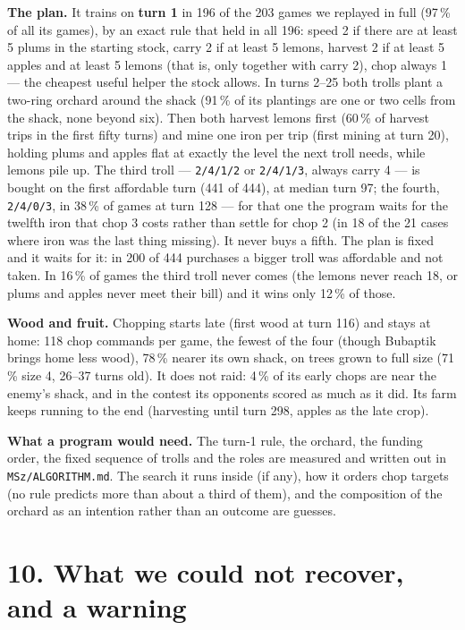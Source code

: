 \documentclass[10pt,a4paper]{article}
\begin{document}
\textbf{The plan.} It trains on \textbf{turn 1} in 196 of the 203 games we replayed in full (97\,\% of all its games), by an exact rule that held in all 196: speed 2 if there are at least 5 plums in the starting stock, carry 2 if at least 5 lemons, harvest 2 if at least 5 apples and at least 5 lemons (that is, only together with carry 2), chop always 1 --- the cheapest useful helper the stock allows. In turns 2--25 both trolls plant a two-ring orchard around the shack (91\,\% of its plantings are one or two cells from the shack, none beyond six). Then both harvest lemons first (60\,\% of harvest trips in the first fifty turns) and mine one iron per trip (first mining at turn 20), holding plums and apples flat at exactly the level the next troll needs, while lemons pile up. The third troll --- \texttt{2/4/1/2} or \texttt{2/4/1/3}, always carry 4 --- is bought on the first affordable turn (441 of 444), at median turn 97; the fourth, \texttt{2/4/0/3}, in 38\,\% of games at turn 128 --- for that one the program waits for the twelfth iron that chop 3 costs rather than settle for chop 2 (in 18 of the 21 cases where iron was the last thing missing). It never buys a fifth. The plan is fixed and it waits for it: in 200 of 444 purchases a bigger troll was affordable and not taken. In 16\,\% of games the third troll never comes (the lemons never reach 18, or plums and apples never meet their bill) and it wins only 12\,\% of those.

\textbf{Wood and fruit.} Chopping starts late (first wood at turn 116) and stays at home: 118 chop commands per game, the fewest of the four (though Bubaptik brings home less wood), 78\,\% nearer its own shack, on trees grown to full size (71\,\% size 4, 26--37 turns old). It does not raid: 4\,\% of its early chops are near the enemy's shack, and in the contest its opponents scored as much as it did. Its farm keeps running to the end (harvesting until turn 298, apples as the late crop).

\textbf{What a program would need.} The turn-1 rule, the orchard, the funding order, the fixed sequence of trolls and the roles are measured and written out in \texttt{MSz/ALGORITHM.md}. The search it runs inside (if any), how it orders chop targets (no rule predicts more than about a third of them), and the composition of the orchard as an intention rather than an outcome are guesses.

\section*{10. What we could not recover, and a warning}
\end{document}
